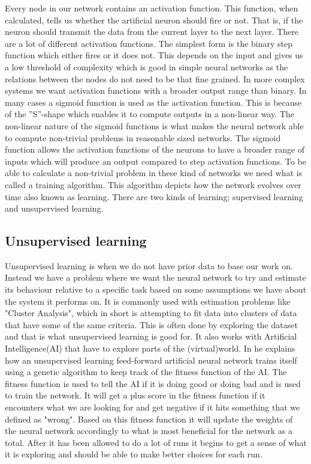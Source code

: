 Every node in our network contains an activation function. This function, when calculated, tells us whether the artificial neuron should fire or not. That is, if the neuron should transmit the data from the current layer to the next layer. There are a lot of different activation functions. The simplest form is the binary step function which either fires or it does not. This depends on the input and gives us a low threshold of complexity which is good in simple neural networks as the relations between the nodes do not need to be that fine grained. In more complex systems we want activation functions with a broader output range than binary. In many cases a sigmoid function is used as the activation function. This is because of the ''S''-shape which enables it to compute outputs in a non-linear way. The non-linear nature of the sigmoid functions is what makes the neural network able to compute non-trivial problems in reasonable sized networks. The sigmoid function allows the activation functions of the neurons to have a broader range of inputs which will produce an output compared to step activation functions. To be able to calculate a non-trivial problem in these kind of networks we need what is called a training algorithm. This algorithm depicts how the network evolves over time also known as learning. There are two kinds of learning; supervised learning and unsupervised learning.

\subsection{Unsupervised learning}
Unsupervised learning is when we do not have prior data to base our work on. Instead we have a problem where we want the neural network to try and estimate its behaviour relative to a specific task based on some assumptions we have about the system it performs on. It is commonly used with estimation problems like "Cluster Analysis", which in short is attempting to fit data into clusters of data that have some of the same criteria. This is often done by exploring the dataset and that is what unsupervised learning is good for. It also works with Artificial Intelligence(AI) that have to explore parts of the (virtual)world. In \cite{buckland2002ai} he explains how an unsupervised learning feed-forward artificial neural network trains itself using a genetic algorithm to keep track of the fitness function of the AI. The fitness function is used to tell the AI if it is doing good or doing bad and is used to train the network. It will get a plus score in the fitness function if it encounters what we are looking for and get negative if it hits something that we defined as "wrong". Based on this fitness function it will update the weights of the neural network accordingly to what is most beneficial for the network as a total. After it has been allowed to do a lot of runs it begins to get a sense of what it is exploring and should be able to make better choices for each run.

